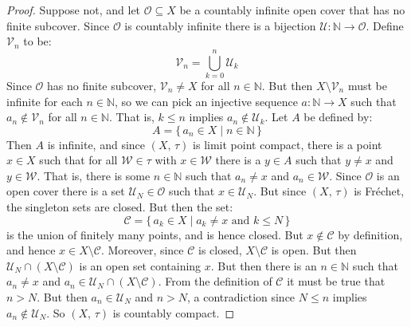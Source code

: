 \documentclass{article}
\theoremstyle{plain}
\theoremstyle{normal}
\begin{document}
        \begin{proof}
            Suppose not, and let $\mathcal{O}\subseteq{X}$ be a countably
            infinite open cover that has no finite subcover. Since
            $\mathcal{O}$ is countably infinite there is a bijection
            $\mathcal{U}:\mathbb{N}\rightarrow\mathcal{O}$. Define
            $\mathcal{V}_{n}$ to be:
            \begin{equation}
                \mathcal{V}_{n}=\bigcup_{k=0}^{n}\mathcal{U}_{k}
            \end{equation}
            Since $\mathcal{O}$ has no finite subcover, $\mathcal{V}_{n}\ne{X}$
            for all $n\in\mathbb{N}$. But then $X\setminus\mathcal{V}_{n}$ must
            be infinite for each $n\in\mathbb{N}$, so we can pick an injective
            sequence $a:\mathbb{N}\rightarrow{X}$ such that
            $a_{n}\notin\mathcal{V}_{n}$ for all $n\in\mathbb{N}$.
            That is, $k\leq{n}$ implies $a_{n}\notin\mathcal{U}_{k}$.
            Let $A$ be defined by:
            \begin{equation}
                A=\{\,a_{n}\in{X}\;|\;n\in\mathbb{N}\,\}
            \end{equation}
            Then $A$ is infinite, and since $(X,\,\tau)$ is limit point compact,
            there is a point $x\in{X}$ such that for all $\mathcal{W}\in\tau$
            with $x\in\mathcal{W}$ there is a $y\in{A}$ such that
            $y\ne{x}$ and $y\in\mathcal{W}$. That is, there is some
            $n\in\mathbb{N}$ such that $a_{n}\ne{x}$ and $a_{n}\in\mathcal{W}$.
            Since $\mathcal{O}$ is an open cover there is a set
            $\mathcal{U}_{N}\in\mathcal{O}$ such that $x\in\mathcal{U}_{N}$.
            But since $(X,\,\tau)$ is Fr\'{e}chet, the singleton sets are
            closed. But then the set:
            \begin{equation}
                \mathcal{C}=
                \{\,a_{k}\in{X}\;|\;a_{k}\ne{x}\textrm{ and }k\leq{N}\,\}
            \end{equation}
            is the union of finitely many points, and is hence closed.
            But $x\notin\mathcal{C}$ by definition, and hence
            $x\in{X}\setminus\mathcal{C}$. Moreover, since $\mathcal{C}$ is
            closed, $X\setminus\mathcal{C}$ is open. But then
            $\mathcal{U}_{N}\cap(X\setminus\mathcal{C})$ is an open set
            containing $x$. But then there is an $n\in\mathbb{N}$ such that
            $a_{n}\ne{x}$ and
            $a_{n}\in\mathcal{U}_{N}\cap(X\setminus\mathcal{C})$. From the
            definition of $\mathcal{C}$ it must be true that
            $n>N$. But then $a_{n}\in\mathcal{U}_{N}$ and $n>N$, a
            contradiction since $N\leq{n}$ implies
            $a_{n}\notin\mathcal{U}_{N}$. So $(X,\,\tau)$ is countably
            compact.
        \end{proof}
\end{document}
